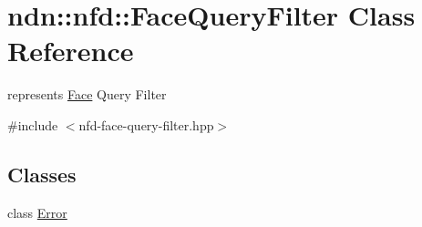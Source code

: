 \hypertarget{classndn_1_1nfd_1_1FaceQueryFilter}{}\section{ndn\+:\+:nfd\+:\+:Face\+Query\+Filter Class Reference}
\label{classndn_1_1nfd_1_1FaceQueryFilter}


represents \hyperlink{classndn_1_1Face}{Face} Query Filter  




{\ttfamily \#include $<$nfd-\/face-\/query-\/filter.\+hpp$>$}

\subsection*{Classes}
\begin{DoxyCompactItemize}
\item 
class \hyperlink{classndn_1_1nfd_1_1FaceQueryFilter_1_1Error}{Error}
\end{DoxyCompactItemize}
